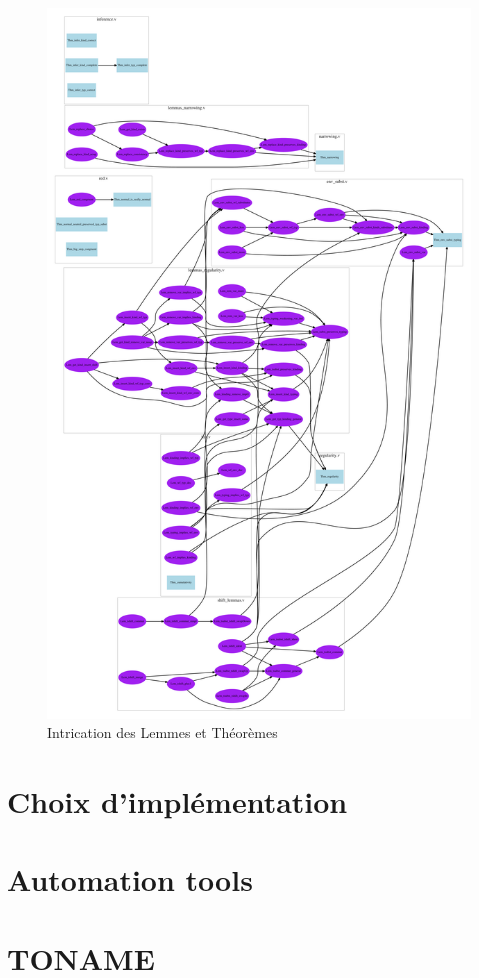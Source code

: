 \documentclass[a4paper,10pt]{scrartcl}
\begin{document}
      \begin{figure}
      
      \noindent\includegraphics[width=0.9\linewidth]{../lol.pdf}
      \caption{Intrication des Lemmes et Théorèmes}
      \label{fig:graph}
      \end{figure}
      
     \section{Choix d'implémentation}
     
     \section{Automation tools}
     
     \section{TONAME}
     
     

    
\end{document}

